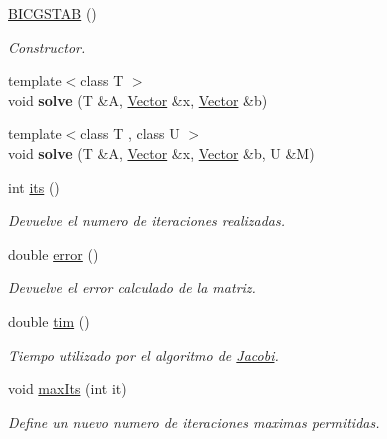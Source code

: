 \begin{DoxyCompactItemize}
\item 
\hypertarget{class_b_i_c_g_s_t_a_b_ab4ac9632753d3529181548e0989528ef}{}\label{class_b_i_c_g_s_t_a_b_ab4ac9632753d3529181548e0989528ef} 
\hyperlink{class_b_i_c_g_s_t_a_b_ab4ac9632753d3529181548e0989528ef}{B\+I\+C\+G\+S\+T\+AB} ()
\begin{DoxyCompactList}\small\item\em Constructor. \end{DoxyCompactList}\item 
\hypertarget{class_b_i_c_g_s_t_a_b_a42ac97e59e0fef0d65837b68bc89e815}{}\label{class_b_i_c_g_s_t_a_b_a42ac97e59e0fef0d65837b68bc89e815} 
{\footnotesize template$<$class T $>$ }\\void {\bfseries solve} (T \&A, \hyperlink{class_vector}{Vector} \&x, \hyperlink{class_vector}{Vector} \&b)
\item 
\hypertarget{class_b_i_c_g_s_t_a_b_ae128d5662be6394f7e06252e1cb967eb}{}\label{class_b_i_c_g_s_t_a_b_ae128d5662be6394f7e06252e1cb967eb} 
{\footnotesize template$<$class T , class U $>$ }\\void {\bfseries solve} (T \&A, \hyperlink{class_vector}{Vector} \&x, \hyperlink{class_vector}{Vector} \&b, U \&M)
\item 
int \hyperlink{class_b_i_c_g_s_t_a_b_aecce9b8f005c466d331c57abf249a11a}{its} ()
\begin{DoxyCompactList}\small\item\em Devuelve el numero de iteraciones realizadas. \end{DoxyCompactList}\item 
double \hyperlink{class_b_i_c_g_s_t_a_b_adc1e9aff5858970c125b18d0ab5ea52b}{error} ()
\begin{DoxyCompactList}\small\item\em Devuelve el error calculado de la matriz. \end{DoxyCompactList}\item 
double \hyperlink{class_b_i_c_g_s_t_a_b_a6a09944cd69150098c82760d058d4857}{tim} ()
\begin{DoxyCompactList}\small\item\em Tiempo utilizado por el algoritmo de \hyperlink{class_jacobi}{Jacobi}. \end{DoxyCompactList}\item 
void \hyperlink{class_b_i_c_g_s_t_a_b_a4fbacde944b86eb6fb24b1ea6f45d5c1}{max\+Its} (int it)
\begin{DoxyCompactList}\small\item\em Define un nuevo numero de iteraciones maximas permitidas. \end{DoxyCompactList}\item 

\end{DoxyCompactItemize}
